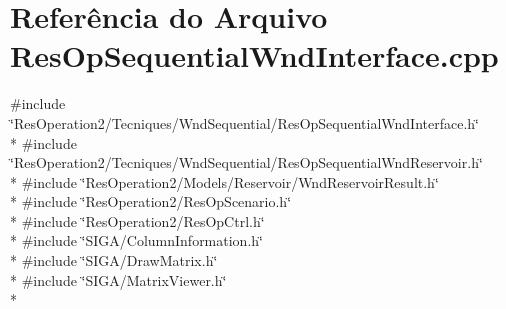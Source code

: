 \section{Referência do Arquivo Res\+Op\+Sequential\+Wnd\+Interface.\+cpp}
\label{_res_op_sequential_wnd_interface_8cpp}
{\ttfamily \#include \char`\"{}Res\+Operation2/\+Tecniques/\+Wnd\+Sequential/\+Res\+Op\+Sequential\+Wnd\+Interface.\+h\char`\"{}}\\*
{\ttfamily \#include \char`\"{}Res\+Operation2/\+Tecniques/\+Wnd\+Sequential/\+Res\+Op\+Sequential\+Wnd\+Reservoir.\+h\char`\"{}}\\*
{\ttfamily \#include \char`\"{}Res\+Operation2/\+Models/\+Reservoir/\+Wnd\+Reservoir\+Result.\+h\char`\"{}}\\*
{\ttfamily \#include \char`\"{}Res\+Operation2/\+Res\+Op\+Scenario.\+h\char`\"{}}\\*
{\ttfamily \#include \char`\"{}Res\+Operation2/\+Res\+Op\+Ctrl.\+h\char`\"{}}\\*
{\ttfamily \#include \char`\"{}S\+I\+G\+A/\+Column\+Information.\+h\char`\"{}}\\*
{\ttfamily \#include \char`\"{}S\+I\+G\+A/\+Draw\+Matrix.\+h\char`\"{}}\\*
{\ttfamily \#include \char`\"{}S\+I\+G\+A/\+Matrix\+Viewer.\+h\char`\"{}}\\*
